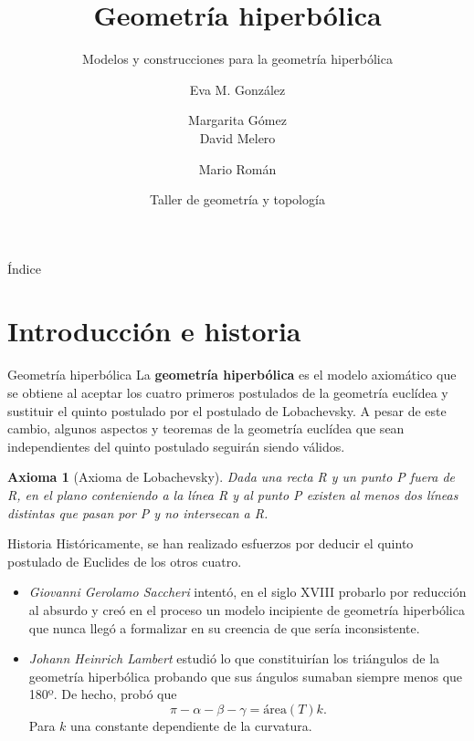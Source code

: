 \documentclass[compress]{beamer}
\title{Geometría hiperbólica}                                               %
\subtitle{Modelos y construcciones para la geometría hiperbólica}                                  %
\author[UGR]{ %
Eva M. González \and Margarita Gómez  \\ David Melero \and Mario Román \texorpdfstring{\\
\href{}{}}{}} %
\date{Taller de geometría y topología}                                                            %
\newtheorem*{axiom}{Axioma}
\begin{document}
\begin{frame}
\titlepage
\end{frame}

\begin{frame}{Índice}
  \hypertarget{index}{}
  \tableofcontents
\end{frame}

\section{Introducción e historia}
\begin{frame}{Geometría hiperbólica}
  La \textbf{geometría hiperbólica} es el modelo axiomático que se
  obtiene al aceptar los cuatro primeros postulados de la geometría
  euclídea y sustituir el quinto postulado por el postulado de
  Lobachevsky. A pesar de este cambio, algunos aspectos y teoremas
  de la geometría euclídea que sean independientes del quinto postulado
  seguirán siendo válidos.
  
  \pause
  
  \begin{axiom}[Axioma de Lobachevsky]
    Dada una recta R y un punto P fuera de R, en el plano conteniendo a
    la línea R y al punto P existen al menos dos líneas distintas que pasan
    por P y no intersecan a R.
  \end{axiom}
\end{frame}

\begin{frame}{Historia}
  Históricamente, se han realizado esfuerzos por deducir el quinto
  postulado de Euclides de los otros cuatro.

  \begin{itemize}
  \item\textit{Giovanni Gerolamo Saccheri} intentó, en el siglo XVIII
    probarlo por reducción al absurdo y creó en el proceso un modelo
    incipiente de geometría hiperbólica que nunca llegó a formalizar
    en su creencia de que sería inconsistente.
  \item\textit{Johann Heinrich Lambert} estudió lo que constituirían
    los triángulos de la geometría hiperbólica probando que sus
    ángulos sumaban siempre menos que 180º. De hecho, probó que
    \[
      \pi - \alpha- \beta - \gamma = \mathrm{área}(T)k.
    \]
    Para $k$ una constante dependiente de la curvatura.
  \end{itemize}
\end{frame}
\end{document}

